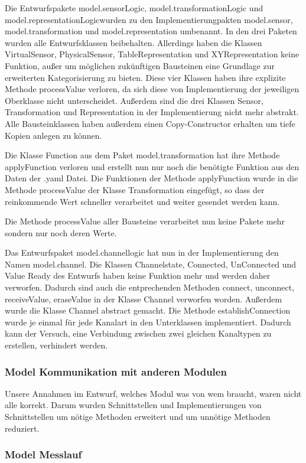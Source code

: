 \documentclass[parskip=full]{scrartcl}
\begin{document}
Die Entwurfspakete model.sensorLogic, model.transformationLogic und model.representationLogicwurden zu den Implementierungpakten model.sensor, model.transformation und model.representation umbenannt. In den drei Paketen wurden alle Entwurfsklassen beibehalten. Allerdings haben die Klassen VirtualSensor, PhysicalSensor, TableRepresentation und XYRepresentation keine Funktion, außer um möglichen zukünftigen Bausteinen eine Grundlage zur erweiterten Kategorisierung zu bieten. Diese vier Klassen haben ihre explizite Methode processValue verloren, da sich diese von Implementierung der jeweiligen Oberklasse nicht unterscheidet. Außerdem sind die drei Klassen Sensor, Transformation und Representation in der Implementierung nicht mehr abstrakt. Alle Bausteinklassen haben außerdem einen Copy-Constructor erhalten um tiefe Kopien anlegen zu können.

Die Klasse Function aus dem Paket model.transformation hat ihre Methode applyFunction verloren und erstellt nun nur noch die benötigte Funktion aus den Daten der .yaml Datei. Die Funktionen der Methode applyFunction wurde in die Methode processValue der Klasse Transformation eingefügt, so dass der reinkommende Wert schneller verarbeitet und weiter gesendet werden kann.

Die Methode processValue aller Bausteine verarbeitet nun keine Pakete mehr sondern nur noch deren Werte.

Das Entwurfspaket model.channellogic hat nun in der Implementierung den Namen model.channel. Die Klassen Channelstate, Connected, UnConnected und Value Ready des Entwurfs haben keine Funktion mehr und werden daher verworfen. Dadurch sind auch die entprechenden Methoden connect, unconnect, receiveValue, eraseValue in der Klasse Channel verworfen worden. Außerdem wurde die Klasse Channel abstract gemacht. Die Methode establishConnection wurde je einmal für jede Kanalart in den Unterklassen implementiert. Dadurch kann der Versuch, eine Verbindung zwischen zwei gleichen Kanaltypen zu erstellen, verhindert werden. 


\subsubsection{Model Kommunikation mit anderen Modulen}
Unsere Annahmen im Entwurf, welches Modul was von wem braucht, waren nicht alle korrekt. Darum wurden Schnittstellen und Implementierungen von Schnittstellen um nötige Methoden erweitert und um unnötige Methoden reduziert.


\subsubsection{Model Messlauf}
\end{document}
